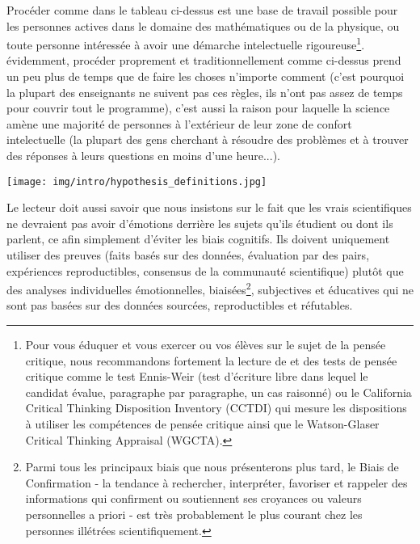 	Proc\'eder comme dans le tableau ci-dessus est une base de travail possible pour les personnes actives dans le domaine des math\'ematiques ou de la physique, ou toute personne int\'eress\'ee à avoir une d\'emarche intelectuelle rigoureuse\footnote{Pour vous éduquer et vous exercer ou vos élèves sur le sujet de la pensée critique, nous recommandons fortement la lecture de \cite{parker2016looseleaf} et des tests de pensée critique comme le test Ennis-Weir (test d'écriture libre dans lequel le candidat évalue, paragraphe par paragraphe, un cas raisonné) ou le California Critical Thinking Disposition Inventory (CCTDI) qui mesure les dispositions à utiliser les compétences de pensée critique ainsi que le Watson-Glaser Critical Thinking Appraisal (WGCTA).}. \'evidemment, proc\'eder proprement et traditionnellement comme ci-dessus prend un peu plus de temps que de faire les choses n'importe comment (c'est pourquoi la plupart des enseignants ne suivent pas ces règles, ils n'ont pas assez de temps pour couvrir tout le programme), c'est aussi la raison pour laquelle la science amène une majorit\'e de personnes à l'ext\'erieur de leur zone de confort intelectuelle (la plupart des gens cherchant à r\'esoudre des problèmes et à trouver des r\'eponses à leurs questions en moins d'une heure...).

\begin{center}
\texttt{[image: img/intro/hypothesis\_definitions.jpg]}
\end{center}
Le lecteur doit aussi savoir que nous insistons sur le fait que les vrais scientifiques ne devraient pas avoir d'\'emotions derrière les sujets qu'ils \'etudient ou dont ils parlent, ce afin simplement d'\'eviter les biais cognitifs. Ils doivent uniquement utiliser des preuves (faits bas\'es sur des donn\'ees, \'evaluation par des pairs, exp\'eriences reproductibles, consensus de la communaut\'e scientifique) plutôt que des analyses individuelles \'emotionnelles, biais\'ees\footnote{Parmi tous les principaux biais que nous présenterons plus tard, le Biais de Confirmation - la tendance à rechercher, interpréter, favoriser et rappeler des informations qui confirment ou soutiennent ses croyances ou valeurs personnelles a priori - est très probablement le plus courant chez les personnes illétrées scientifiquement.}, subjectives et \'educatives qui ne sont pas bas\'ees sur des donn\'ees sourc\'ees, reproductibles et r\'efutables.

